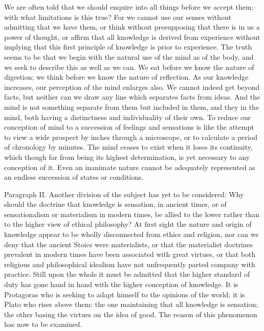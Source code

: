 We are often told that we should enquire into all things before we
accept them;--with what limitations is this true? For we cannot use
our senses without admitting that we have them, or think without
presupposing that there is in us a power of thought, or affirm that all
knowledge is derived from experience without implying that this first
principle of knowledge is prior to experience. The truth seems to be
that we begin with the natural use of the mind as of the body, and
we seek to describe this as well as we can. We eat before we know the
nature of digestion; we think before we know the nature of reflection.
As our knowledge increases, our perception of the mind enlarges also. We
cannot indeed get beyond facts, but neither can we draw any line which
separates facts from ideas. And the mind is not something separate
from them but included in them, and they in the mind, both having a
distinctness and individuality of their own. To reduce our conception of
mind to a succession of feelings and sensations is like the attempt to
view a wide prospect by inches through a microscope, or to calculate a
period of chronology by minutes. The mind ceases to exist when it loses
its continuity, which though far from being its highest determination,
is yet necessary to any conception of it. Even an inanimate nature
cannot be adequately represented as an endless succession of states or
conditions.

Paragraph II. Another division of the subject has yet to be considered:
Why should the doctrine that knowledge is sensation, in ancient times,
or of sensationalism or materialism in modern times, be allied to the
lower rather than to the higher view of ethical philosophy? At
first sight the nature and origin of knowledge appear to be wholly
disconnected from ethics and religion, nor can we deny that the ancient
Stoics were materialists, or that the materialist doctrines prevalent
in modern times have been associated with great virtues, or that both
religious and philosophical idealism have not unfrequently parted
company with practice. Still upon the whole it must be admitted that the
higher standard of duty has gone hand in hand with the higher conception
of knowledge. It is Protagoras who is seeking to adapt himself to
the opinions of the world; it is Plato who rises above them: the one
maintaining that all knowledge is sensation; the other basing the
virtues on the idea of good. The reason of this phenomenon has now to be
examined.

